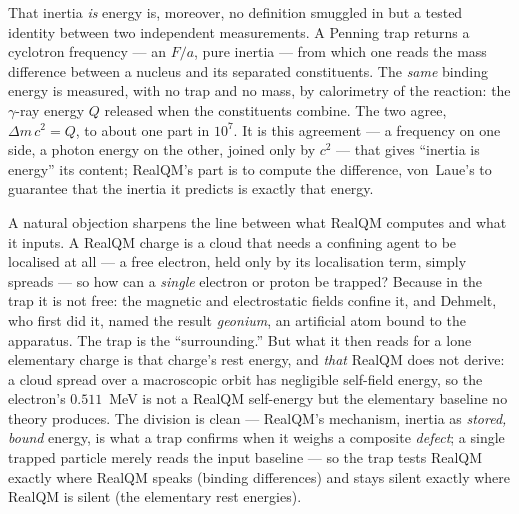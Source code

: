 That inertia \emph{is} energy is, moreover, no definition smuggled in but a tested identity between two independent
measurements. A Penning trap returns a cyclotron frequency --- an $F/a$, pure inertia --- from which one reads the
mass difference between a nucleus and its separated constituents. The \emph{same} binding energy is measured, with
no trap and no mass, by calorimetry of the reaction: the $\gamma$-ray energy $Q$ released when the constituents
combine. The two agree, $\Delta m\,c^2=Q$, to about one part in $10^{7}$. It is this agreement --- a frequency on
one side, a photon energy on the other, joined only by $c^2$ --- that gives ``inertia is energy'' its content;
RealQM's part is to compute the difference, von~Laue's to guarantee that the inertia it predicts is exactly that
energy.

A natural objection sharpens the line between what RealQM computes and what it inputs. A RealQM charge is a cloud
that needs a confining agent to be localised at all --- a free electron, held only by its localisation term, simply
spreads --- so how can a \emph{single} electron or proton be trapped? Because in the trap it is not free: the
magnetic and electrostatic fields confine it, and Dehmelt, who first did it, named the result \emph{geonium}, an
artificial atom bound to the apparatus. The trap is the ``surrounding.'' But what it then reads for a lone
elementary charge is that charge's rest energy, and \emph{that} RealQM does not derive: a cloud spread over a
macroscopic orbit has negligible self-field energy, so the electron's $0.511$~MeV is not a RealQM self-energy but
the elementary baseline no theory produces. The division is clean --- RealQM's mechanism, inertia as \emph{stored,
bound} energy, is what a trap confirms when it weighs a composite \emph{defect}; a single trapped particle merely
reads the input baseline --- so the trap tests RealQM exactly where RealQM speaks (binding differences) and stays
silent exactly where RealQM is silent (the elementary rest energies).

